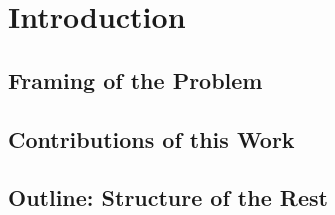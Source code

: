 
\chapter{Introduction}


\section{Framing of the Problem}


\section{Contributions of this Work}
\section{Outline: Structure of the Rest}


